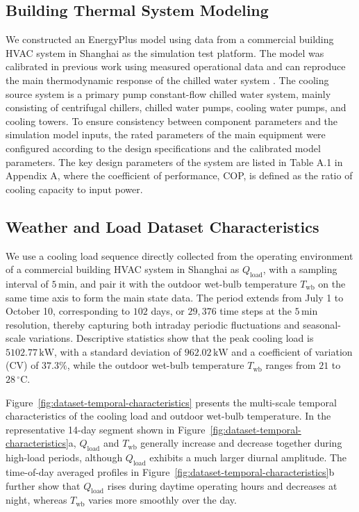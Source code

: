 ﻿\documentclass[preprint,12pt,number]{elsarticle}
\begin{document}
\subsection{Building Thermal System Modeling}\label{building-thermal-system-modeling}

We constructed an EnergyPlus model using data from a commercial building HVAC system in Shanghai as the simulation test platform. The model was calibrated in previous work using measured operational data and can reproduce the main thermodynamic response of the chilled water system \cite{ref29}. The cooling source system is a primary pump constant-flow chilled water system, mainly consisting of centrifugal chillers, chilled water pumps, cooling water pumps, and cooling towers. To ensure consistency between component parameters and the simulation model inputs, the rated parameters of the main equipment were configured according to the design specifications and the calibrated model parameters. The key design parameters of the system are listed in Table A.1 in Appendix A, where the coefficient of performance, COP, is defined as the ratio of cooling capacity to input power.

\subsection{Weather and Load Dataset Characteristics}\label{weather-and-load-dataset-characteristics}

We use a cooling load sequence directly collected from the operating environment of a commercial building HVAC system in Shanghai as \(Q_{\mathrm{load}}\), with a sampling interval of \(5\,\mathrm{min}\), and pair it with the outdoor wet-bulb temperature \(T_{\mathrm{wb}}\) on the same time axis to form the main state data. The period extends from July 1 to October 10, corresponding to \(102\) days, or \(29,376\) time steps at the \(5\,\mathrm{min}\) resolution, thereby capturing both intraday periodic fluctuations and seasonal-scale variations. Descriptive statistics show that the peak cooling load is \(5102.77\,\mathrm{kW}\), with a standard deviation of \(962.02\,\mathrm{kW}\) and a coefficient of variation (CV) of \(37.3\%\), while the outdoor wet-bulb temperature \(T_{\mathrm{wb}}\) ranges from \(21\) to \(28\,\mathrm{^{\circ}C}\).

Figure~\ref{fig:dataset-temporal-characteristics} presents the multi-scale temporal characteristics of the cooling load and outdoor wet-bulb temperature. In the representative 14-day segment shown in Figure~\ref{fig:dataset-temporal-characteristics}a, \(Q_{\mathrm{load}}\) and \(T_{\mathrm{wb}}\) generally increase and decrease together during high-load periods, although \(Q_{\mathrm{load}}\) exhibits a much larger diurnal amplitude. The time-of-day averaged profiles in Figure~\ref{fig:dataset-temporal-characteristics}b further show that \(Q_{\mathrm{load}}\) rises during daytime operating hours and decreases at night, whereas \(T_{\mathrm{wb}}\) varies more smoothly over the day.
\end{document}
